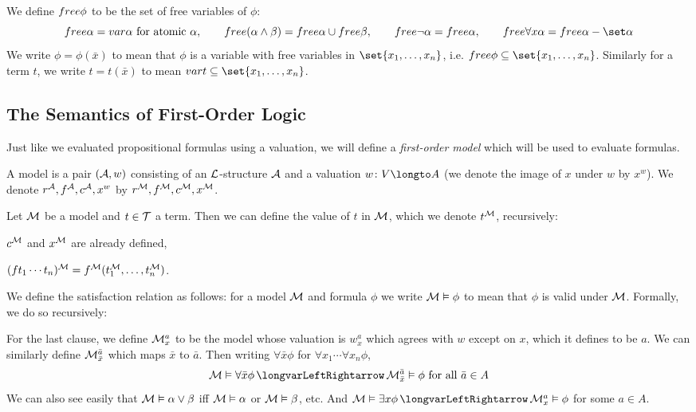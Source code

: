 We define ${\sl free}\phi$ to be the set of free variables of $\phi$:
$$ \free\alpha = \var\alpha\hbox{ for atomic $\alpha$},\qquad
\free(\alpha\land\beta)=\free\alpha\cup\free\beta,\qquad
\free\neg\alpha=\free\alpha,\qquad \free\forall x\alpha = \free\alpha-\set\alpha $$
We write $\phi=\phi(\bar x)$ to mean that $\phi$ is a variable with free variables in
$\set{x_1,\dots,x_n}$, i.e. $\free\phi\subseteq\set{x_1,\dots,x_n}$.
Similarly for a term $t$, we write $t=t(\bar x)$ to mean $\var t\subseteq\set{x_1,\dots,x_n}$.

\subsection{The Semantics of First-Order Logic}

Just like we evaluated propositional formulas using a valuation, we will define a {\it first-order
model} which will be used to evaluate formulas.

\bdefn

    A {\emphcolor model} is a pair $({\cal A},w)$ consisting of an ${\cal L}$-structure ${\cal A}$
    and a valuation $w\colon V\longto A$ (we denote the image of $x$ under $w$ by $x^w$).
    We denote $r^{{\cal A}},f^{{\cal A}},c^{{\cal A}},x^w$ by $r^{{\cal M}},f^{{\cal M}},c^{{\cal M}},x^{{\cal M}}$.

\edefn

Let ${\cal M}$ be a model and $t\in{\cal T}$ a term.
Then we can define the value of $t$ in ${\cal M}$, which we denote $t^{{\cal M}}$, recursively:
\benum
    \item $c^{{\cal M}}$ and $x^{{\cal M}}$ are already defined,
    \item $(ft_1\cdots t_n)^{{\cal M}}=f^{{\cal M}}(t_1^{{\cal M}},\dots,t_n^{{\cal M}})$.
\eenum

We define the satisfaction relation as follows: for a model ${\cal M}$ and formula $\phi$
we write ${\cal M}\vDash\phi$ to mean that $\phi$ is valid under ${\cal M}$.
Formally, we do so recursively:

\centerline{\vbox{}}

For the last clause, we define ${\cal M}^a_x$ to be the model whose valuation is $w^a_x$ which agrees
with $w$ except on $x$, which it defines to be $a$.
We can similarly define ${\cal M}^{\bar a}_{\bar x}$ which maps $\bar x$ to $\bar a$.
Then writing $\forall\bar x\phi$ for $\forall x_1\cdots\forall x_n\phi$,
$$ \c M\vDash\forall\bar x\phi \iff \c M^{\bar a}_{\bar x}\vDash\phi\hbox{ for all $\bar a\in A$}
$$
We can also see easily that ${\cal M}\vDash\alpha\lor\beta$ iff ${\cal M}\vDash\alpha$ or
${\cal M}\vDash\beta$, etc.
And $\c M\vDash\exists x\phi\iff\c M^a_x\vDash\phi$ for some $a\in A$.

